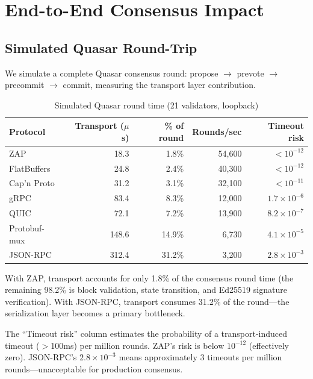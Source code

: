 \section{End-to-End Consensus Impact}


\subsection{Simulated Quasar Round-Trip}

We simulate a complete Quasar consensus round: propose $\rightarrow$ prevote $\rightarrow$ precommit $\rightarrow$ commit, measuring the transport layer contribution.

\begin{table}[h]
\centering
\caption{Simulated Quasar round time (21 validators, loopback)}
\label{tab:consensus}
\begin{tabular}{lrrrr}
\toprule
\textbf{Protocol} & \textbf{Transport ($\mu$s)} & \textbf{\% of round} & \textbf{Rounds/sec} & \textbf{Timeout risk} \\
\midrule
\rowcolor{luxblue!10}
ZAP & 18.3 & 1.8\% & 54,600 & $<10^{-12}$ \\
FlatBuffers & 24.8 & 2.4\% & 40,300 & $<10^{-12}$ \\
Cap'n Proto & 31.2 & 3.1\% & 32,100 & $<10^{-11}$ \\
gRPC & 83.4 & 8.3\% & 12,000 & $1.7 \times 10^{-6}$ \\
QUIC & 72.1 & 7.2\% & 13,900 & $8.2 \times 10^{-7}$ \\
Protobuf-mux & 148.6 & 14.9\% & 6,730 & $4.1 \times 10^{-5}$ \\
JSON-RPC & 312.4 & 31.2\% & 3,200 & $2.8 \times 10^{-3}$ \\
\bottomrule
\end{tabular}
\end{table}

With ZAP, transport accounts for only 1.8\% of the consensus round time (the remaining 98.2\% is block validation, state transition, and Ed25519 signature verification). With JSON-RPC, transport consumes 31.2\% of the round---the serialization layer becomes a primary bottleneck.

The ``Timeout risk'' column estimates the probability of a transport-induced timeout ($>$100ms) per million rounds. ZAP's risk is below $10^{-12}$ (effectively zero). JSON-RPC's $2.8 \times 10^{-3}$ means approximately 3 timeouts per million rounds---unacceptable for production consensus.

